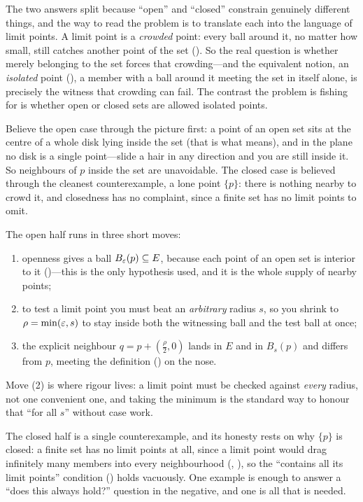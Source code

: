 \documentclass[main.tex]{subfiles}
\begin{document}
\begin{Reflection}
The two answers split because ``open'' and ``closed'' constrain genuinely different things, and the way
to read the problem is to translate each into the language of limit points. A limit point is a
\emph{crowded} point: every ball around it, no matter how small, still catches another point of the set
(). So the real question is whether merely belonging to the set forces that crowding---and
the equivalent notion, an \emph{isolated} point (), a member with a ball around it meeting
the set in itself alone, is precisely the witness that crowding can fail. The contrast the problem is
fishing for is whether open or closed sets are allowed isolated points.

Believe the open case through the picture first: a point of an open set sits at the centre of a whole
disk lying inside the set (that is what  means), and in the plane no disk is a single
point---slide a hair in any direction and you are still inside it. So neighbours of $p$ inside the set
are unavoidable. The closed case is believed through the cleanest counterexample, a lone point
$\{p\}$: there is nothing nearby to crowd it, and closedness has no complaint, since a finite set has
no limit points to omit.

The open half runs in three short moves:
\begin{enumerate}[leftmargin=1.7em,itemsep=3pt,topsep=2pt,label=\textnormal{(\arabic*)}]
  \item openness gives a ball $B_{\varepsilon}(p)\subseteq E$, because each point of an open set is interior to
        it ()---this is the only hypothesis used, and it is the whole supply of nearby
        points;
  \item to test a limit point you must beat an \emph{arbitrary} radius $s$, so you shrink to
        $\rho=\min(\varepsilon,s)$ to stay inside both the witnessing ball and the test ball at once;
  \item the explicit neighbour $q=p+(\tfrac{\rho}{2},0)$ lands in $E$ and in $B_{s}(p)$ and differs
        from $p$, meeting the definition () on the nose.
\end{enumerate}
Move (2) is where rigour lives: a limit point must be checked against \emph{every} radius, not one
convenient one, and taking the minimum is the standard way to honour that ``for all $s$'' without case
work.

The closed half is a single counterexample, and its honesty rests on why $\{p\}$ is closed: a finite
set has no limit points at all, since a limit point would drag infinitely many members into every
neighbourhood (, ), so the
``contains all its limit points'' condition () holds vacuously. One example is enough to
answer a ``does this always hold?'' question in the negative, and one is all that is needed.


\end{Reflection}
\end{document}
